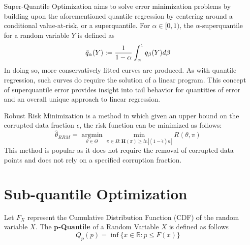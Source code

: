 \documentclass{article} %
\begin{document}
	Super-Quantile Optimization \cite{ROCKAFELLAR2014140} aims to solve error minimization problems by building upon the aforementioned quantile regression by centering around a conditional value-at-risk, or a superquantile. For $\alpha \in [0,1)$, the $\alpha$-superquantile for a random variable $Y$ is defined as \begin{equation}
		\Bar{q}_\alpha (Y) := \frac{1}{1-\alpha} \int_\alpha^1 q_\beta (Y) d\beta
	\end{equation}
	In doing so, more conservatively fitted curves are produced. As with quantile regression, such curves do require the solution of a linear program.
	This concept of superquantile error provides insight into tail behavior for quantities of error and an overall unique approach to linear regression.
	
	Robust Risk Minimization \cite{RRM} is a method in which given an upper bound on the corrupted data fraction $\epsilon$, the risk function can be minimized as follows:
	\begin{equation}
		\hat{\mathbb{\theta}}_{RRM} = \operatorname*{argmin}_{\theta \in \Theta} \operatorname*{min}_{\pi \in \Pi: \mathbf{H}(\pi) \geq ln|(1-\tilde{\epsilon})n|} R(\mathbb{\theta,\pi})
	\end{equation}
	This method is popular as it does not require the removal of corrupted data points and does not rely on a specified corruption fraction.
		
	\section{Sub-quantile Optimization}
	\label{sec:sub-quantile-optimization}
	
	\begin{definition}
		Let $F_X$ represent the Cumulative Distribution Function (CDF) of the random variable $X$. The \textbf{$\mathbf{p}$-Quantile} of a Random Variable $X$ is defined as follows \vspace{1em}
		\begin{equation}
			Q_p(p) = \inf\{x\in\mathbb{R}: p \leq F(x)\} 
		\end{equation}
	\end{definition}
	
\end{document}
